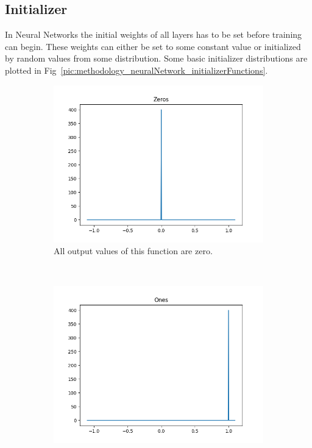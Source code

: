 \newpage

\subsection{Initializer}
In Neural Networks the initial weights of all layers has to be set before training can begin. These weights can either be set to some constant value or initialized by random values from some distribution. Some basic initializer distributions are plotted in Fig~\ref{pic:methodology_neuralNetwork_initializerFunctions}.

\newpage

\begin{figure}[h!]
	\centering
	\begin{subfigure}[t]{0.5\textwidth}
		\centering
		\includegraphics[width=\textwidth]{img/methodology_neuralNetwork_initializerFunctions_zeros.png}
		\caption{All output values of this function are zero.}
	\end{subfigure}%
	~ 
	\begin{subfigure}[t]{0.5\textwidth}
		\centering
		\includegraphics[width=\textwidth]{img/methodology_neuralNetwork_initializerFunctions_ones.png}

\end{subfigure}
\end{figure}
